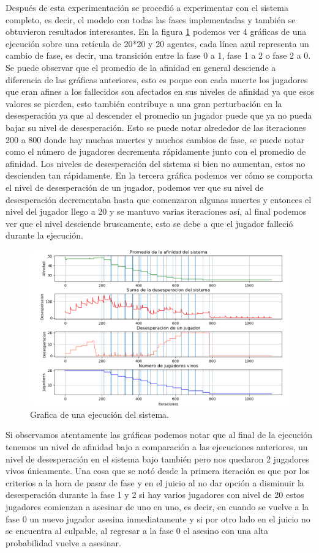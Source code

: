 \documentclass[11pt,letterpaper]{article}
\begin{document}
Después de esta experimentación se procedió a experimentar con el sistema completo, 
es decir, el modelo con todas las fases implementadas y también se obtuvieron 
resultados interesantes. En la figura \ref{fig:graficait7cnmuertes} podemos ver 4 
gráficas de una ejecución sobre una retícula de 20*20 y 20 agentes, cada línea azul 
representa un cambio de fase, es decir, una transición entre la fase 0 a 1, fase 1 
a 2 o fase 2 a 0. Se puede observar que el promedio de la afinidad en general 
desciende a diferencia de las gráficas anteriores, esto es poque con cada muerte
los jugadores que eran afines a los fallecidos son afectados en sus niveles de 
afinidad ya que esos valores se pierden, esto también contribuye a una gran 
perturbación en la desesperación ya que al descender el promedio un jugador puede
que ya no pueda bajar su nivel de desesperación. Esto se puede notar alrededor de 
las iteraciones 200 a 800 donde hay muchas muertes y muchos cambios de fase, 
se puede notar como el número de jugadores decrementa rápidamente junto con el 
promedio de afinidad. Los niveles de desesperación del sistema si bien no aumentan,
estos no descienden tan rápidamente. En la tercera gráfica podemos ver cómo se 
comporta el nivel de desesperación de un jugador, podemos ver que su nivel de 
desesperación decrementaba hasta que comenzaron algunas muertes y entonces el nivel
del jugador llego a 20 y se mantuvo varias iteraciones así, al final podemos ver que
el nivel desciende bruscamente, esto se debe a que el jugador falleció durante la 
ejecución. 

\begin{figure}[h!]
	\centering
	\includegraphics[width=0.7\linewidth]{Grafica_It_7cnMuertes}
	\caption{Grafica de una ejecución del sistema.}
	\label{fig:graficait7cnmuertes}
\end{figure}

Si observamos atentamente las gráficas podemos notar que al final de la ejecución tenemos un nivel de afinidad bajo a comparación a las ejecuciones anteriores, un 
nivel de desesperación en el sistema bajo también pero nos quedaron 2 jugadores 
vivos únicamente. Una cosa que se notó desde la primera iteración es que por
los criterios a la hora de pasar de fase y en el juicio al no dar opción
a disminuir la desesperación durante la fase 1 y 2 si hay varios jugadores
con nivel de 20 estos jugadores comienzan a asesinar de uno en uno, es decir, en 
cuando se vuelve a la fase 0 un nuevo jugador asesina inmediatamente y si por otro 
lado en el juicio no se encuentra al culpable, al regresar a la fase 0 el asesino 
con una alta probabilidad vuelve a asesinar.
\end{document}
